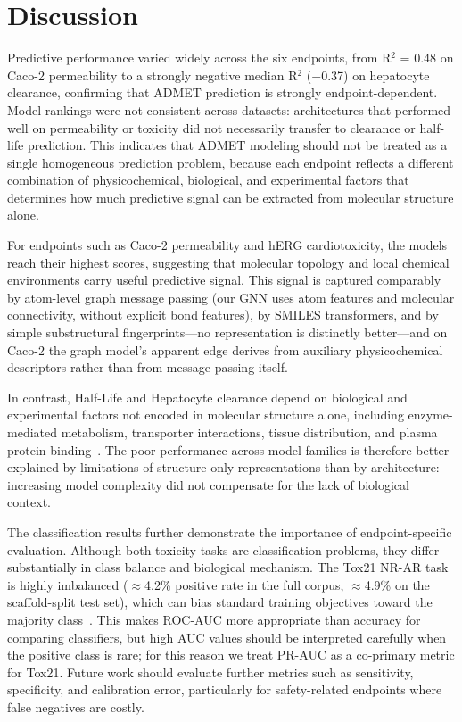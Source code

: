\documentclass[journal]{IEEEtran}
\begin{document}
\section{Discussion}
\label{sec:discussion}

Predictive performance varied widely across the six endpoints, from R$^2$ = 0.48 on Caco-2 permeability to a strongly negative median R$^2$ ($-$0.37) on hepatocyte clearance, confirming that ADMET prediction is strongly endpoint-dependent. Model rankings were not consistent across datasets: architectures that performed well on permeability or toxicity did not necessarily transfer to clearance or half-life prediction. This indicates that ADMET modeling should not be treated as a single homogeneous prediction problem, because each endpoint reflects a different combination of physicochemical, biological, and experimental factors that determines how much predictive signal can be extracted from molecular structure alone.

For endpoints such as Caco-2 permeability and hERG cardiotoxicity, the models reach their highest scores, suggesting that molecular topology and local chemical environments carry useful predictive signal. This signal is captured comparably by atom-level graph message passing (our GNN uses atom features and molecular connectivity, without explicit bond features), by SMILES transformers, and by simple substructural fingerprints---no representation is distinctly better---and on Caco-2 the graph model's apparent edge derives from auxiliary physicochemical descriptors rather than from message passing itself.

In contrast, Half-Life and Hepatocyte clearance depend on biological and experimental factors not encoded in molecular structure alone, including enzyme-mediated metabolism, transporter interactions, tissue distribution, and plasma protein binding~\cite{li2019dmpk,lai2022dmpk,bohnert2013proteinbinding}. The poor performance across model families is therefore better explained by limitations of structure-only representations than by architecture: increasing model complexity did not compensate for the lack of biological context.

The classification results further demonstrate the importance of endpoint-specific evaluation. Although both toxicity tasks are classification problems, they differ substantially in class balance and biological mechanism. The Tox21 NR-AR task is highly imbalanced ($\approx$4.2\% positive rate in the full corpus, $\approx$4.9\% on the scaffold-split test set), which can bias standard training objectives toward the majority class~\cite{he2009imbalanced}. This makes ROC-AUC more appropriate than accuracy for comparing classifiers, but high AUC values should be interpreted carefully when the positive class is rare; for this reason we treat PR-AUC as a co-primary metric for Tox21. Future work should evaluate further metrics such as sensitivity, specificity, and calibration error, particularly for safety-related endpoints where false negatives are costly.
\end{document}
